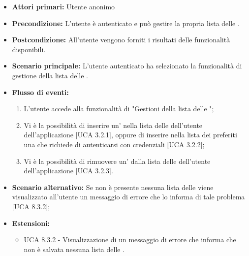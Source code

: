 \begin{itemize}
	\item \textbf{Attori primari:} Utente anonimo
	\item \textbf{Precondizione:} L'utente è autenticato e può gestire la propria lista delle .
	\item \textbf{Postcondizione:} All'utente vengono forniti i risultati delle funzionalità disponibili.
	\item \textbf{Scenario principale:} L'utente autenticato ha selezionato la funzionalità di gestione della lista delle .
	\item \textbf{Flusso di eventi:}
			\begin{enumerate}
			\item L'utente accede alla funzionalità di "Gestioni della lista delle ";
			\item Vi è la possibilità di inserire un' nella lista delle  dell'utente dell'applicazione [UCA 3.2.1], oppure di inserire nella lista dei preferiti una  che richiede di autenticarsi con credenziali  [UCA 3.2.2];
			\item Vi è la possibilità di rimuovere un' dalla lista delle  dell'utente dell'applicazione [UCA 3.2.3].
			\end{enumerate}
	\item \textbf{Scenario alternativo:} Se non è presente nessuna lista delle  viene visualizzato all'utente un messaggio di errore che lo informa di tale problema [UCA 8.3.2];
	\item \textbf{Estensioni:}
	\begin{itemize}
		\item UCA 8.3.2 - Visualizzazione di un messaggio di errore che informa che non è salvata nessuna lista delle .
	\end{itemize}
\end{itemize}

